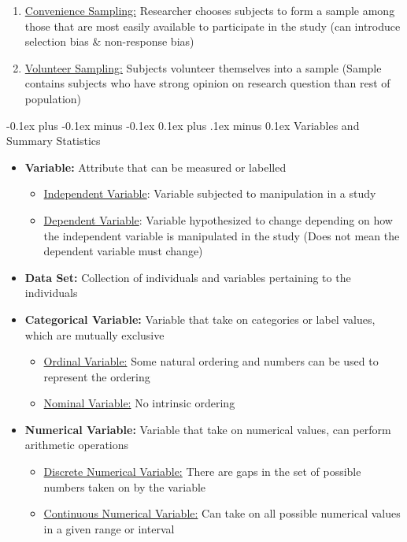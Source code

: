\documentclass[landscape]{article}
\makeatletter
\renewcommand{\subsection}{\@startsection{subsection}{2}{0mm}%
  {-0.1ex plus -0.1ex minus -0.1ex}%
  {0.1ex plus .1ex minus 0.1ex}%
{\normalfont\scriptsize\bfseries}}
\makeatother
\begin{document}
\begin{multicols*}{5}
\begin{itemize}
        \begin{enumerate}
          \item \underline{Convenience Sampling:} Researcher chooses subjects to form a sample among those that are most easily available to participate in the study (can introduce selection bias \& non-response bias)
          \item \underline{Volunteer Sampling:} Subjects volunteer themselves into a sample (Sample contains subjects who have strong opinion on research question than rest of population)
        \end{enumerate}
      \end{itemize}

    \subsection{Variables and Summary Statistics}
      \begin{itemize}
        \item \textbf{Variable:} Attribute that can be measured or labelled
        \begin{itemize}
          \item \underline{Independent Variable}: Variable subjected to manipulation in a study
          \item \underline{Dependent Variable}: Variable hypothesized to change depending on how the independent variable is manipulated in the study (Does not mean the dependent variable must change)
        \end{itemize}
        \item \textbf{Data Set:} Collection of individuals and variables pertaining to the individuals
        \item \textbf{Categorical Variable:} Variable that take on categories or label values, which are mutually exclusive
        \begin{itemize}
          \item \underline{Ordinal Variable:} Some natural ordering and numbers can be used to represent the ordering
          \item \underline{Nominal Variable:} No intrinsic ordering
        \end{itemize}
        \item \textbf{Numerical Variable:} Variable that take on numerical values, can perform arithmetic operations
        \begin{itemize}
          \item \underline{Discrete Numerical Variable:} There are gaps in the set of possible numbers taken on by the variable
          \item \underline{Continuous Numerical Variable:}  Can take on all possible numerical values in a given range or interval
        \end{itemize}
      \end{itemize}


\end{multicols*}
\end{document}
